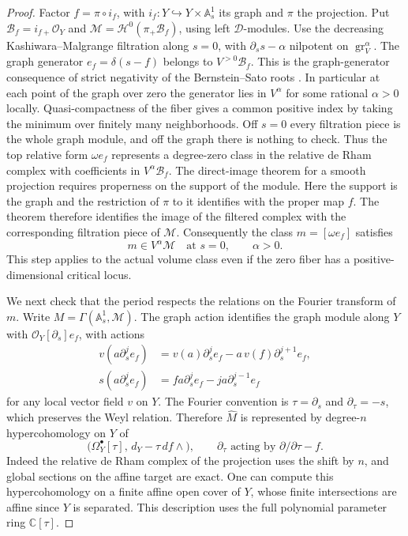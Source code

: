 \begin{proof}
Factor \(f=\pi\circ i_f\), with \(i_f:Y\hookrightarrow
Y\times\mathbb A^1_s\) its graph and \(\pi\) the projection. Put
\(\mathcal B_f=i_{f+}\mathcal O_Y\) and
\(\mathcal M=\mathcal H^0(\pi_+\mathcal B_f)\), using left
\(\mathcal D\)-modules. Use the decreasing Kashiwara--Malgrange
filtration along \(s=0\), with
\(\partial_s s-\alpha\) nilpotent on \(\operatorname{gr}_V^\alpha\).
The graph generator \(e_f=\delta(s-f)\) belongs to
\(V^{>0}\mathcal B_f\). This is the graph-generator consequence of
strict negativity of the Bernstein--Sato roots
\cite[Corollary~5.2]{kashiwara-b-functions}
\cite[Corollary~5.15 and Example~5.19]{chen-dirks-mustata}.
In particular at each point of the graph over zero the generator
lies in \(V^\alpha\) for some rational \(\alpha>0\) locally.
Quasi-compactness of the fiber gives a common positive index
by taking the minimum over finitely many neighborhoods.
Off \(s=0\) every filtration piece is the whole graph module, and
off the graph there is nothing to check. Thus the top relative
form \(\omega e_f\) represents a degree-zero class in the relative
de Rham complex with coefficients in \(V^\alpha\mathcal B_f\).
The direct-image theorem for a smooth projection
\cite[Theorem~8.1]{chen-dirks-mustata} requires properness on the support
of the module. Here the support is the graph and the restriction of
\(\pi\) to it identifies with the proper map \(f\). The theorem therefore
identifies the image of the filtered complex with the corresponding
filtration piece of \(\mathcal M\). Consequently the class
\(m=[\omega e_f]\) satisfies
\[
 m\in V^\alpha\mathcal M\quad\text{at }s=0,\qquad \alpha>0.
\]
This step applies to the actual volume class even if the zero fiber
has a positive-dimensional critical locus.

We next check that the period respects the relations on the Fourier
transform of \(m\). Write \(M=\Gamma(\mathbb A^1_s,\mathcal M)\).
The graph action \cite[Equation~(27)]{chen-dirks-mustata} identifies
the graph module along \(Y\) with \(\mathcal O_Y[\partial_s]e_f\),
with actions
\[
 \begin{split}
 v(a\partial_s^j e_f)&=v(a)\partial_s^j e_f
                     -a\,v(f)\partial_s^{j+1}e_f,\\
 s(a\partial_s^j e_f)&=fa\partial_s^j e_f
                     -j a\partial_s^{j-1}e_f
 \end{split}
\]
for any local vector field \(v\) on \(Y\).
The Fourier convention is \(\tau=\partial_s\) and
\(\partial_\tau=-s\), which preserves the Weyl relation. Therefore
\(\widehat M\) is represented by degree-\(n\) hypercohomology on \(Y\) of
\[
 \bigl(\Omega_Y^\bullet[\tau],\,d_Y-\tau\,df\wedge\bigr),
 \qquad \partial_\tau\text{ acting by }\partial/\partial\tau-f.
\]
Indeed the relative de Rham complex of the projection uses the shift
by \(n\), and global sections on the affine target are exact.
One can compute this hypercohomology on a finite affine open cover of
\(Y\), whose finite intersections are affine since \(Y\) is separated.
This description uses the full polynomial parameter ring
\(\mathbb C[\tau]\).


\end{proof}
